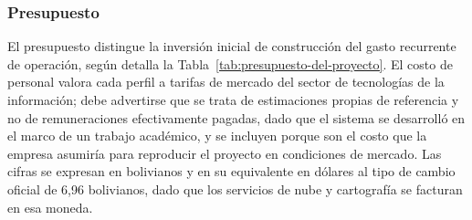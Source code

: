 \subsubsection{Presupuesto}\label{presupuesto}

El presupuesto distingue la inversión inicial de construcción del gasto recurrente de operación, según detalla la Tabla~\ref{tab:presupuesto-del-proyecto}. El costo de personal valora cada perfil a tarifas de mercado del sector de tecnologías de la información; debe advertirse que se trata de estimaciones propias de referencia y no de remuneraciones efectivamente pagadas, dado que el sistema se desarrolló en el marco de un trabajo académico, y se incluyen porque son el costo que la empresa asumiría para reproducir el proyecto en condiciones de mercado. Las cifras se expresan en bolivianos y en su equivalente en dólares al tipo de cambio oficial de 6,96 bolivianos, dado que los servicios de nube y cartografía se facturan en esa moneda.

\label{tab:presupuesto-del-proyecto}

